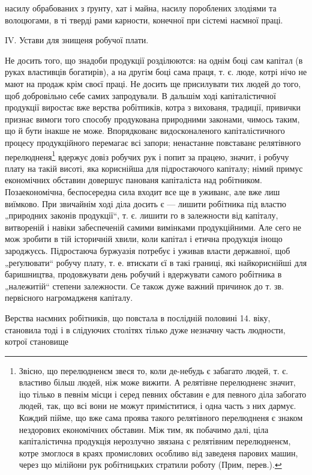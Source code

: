 насилу обрабованих з ґрунту, хат і майна, насилу пороблених
злодіями та волоцюгами, в ті тверді рами карности,
конечної при сістемі наємної праці.

IV.    Устави для знищеня робучої плати.

Не досить того, що знадоби продукції розділюются:
на однім боці сам капітал (в руках властивців богатирів),
а на другім боці сама праця, т. є. люде, котрі нічо не мают
на продаж крім своєї праці. Не досить ще присилувати
тих людей до того, щоб добровільно себе самих запродували.
В дальшім ході капіталістичної продукції виростає
вже верства робітпиків, котра з вихованя, традиції, привички
признає вимоги того способу продукована природними законами,
чимось таким, що й бути інакше не може. Впорядкованє
видосконаленого капіталістичного процесу продукційного
перемагає всі запори; ненастанне повставанє релятівного
перелюдненя\footnote*{
Звісно, що перелюдненєм звеся то, коли де-небудь є забагато
людей, т. є. властиво більш людей, ніж може вижити. А релятівне перелюдненє
значит, іцо тілько в певнім місци і серед певних обставин е для
певного діла забогато людей, так, що всі вони не можут приміститися,
і одна часть з них дармує. Кождий пійме, що вже сама проява такого
релятівного перелюдненя є знаком нездорових економічних обставин.
Між тим, як побачимо далі, ціла капіталістична продукція нерозлучно
звязана с релятівним перелюдненєм, котре змоглося в краях промислових
особливо від заведеня парових машин, через що мілійони рук робітницьких
стратили роботу (Прим, перев.).
} вдержує довіз робучих рук і попит
за працею, значит, і робучу плату на такій висоті, яка кориснійша
для підростаючого капіталу; німий примус економічних
обставин довершує панованя капіталіста над робітником.
Позаекономічна, беспосередна сила входит все ще
в уживанє, але вже лиш виїмково. При звичайнім ході діла
досить є — лишити робітника під властю „природних законів
продукції“, т. є. лишити го в залежности від капіталу,
витвореній і навіки забеспеченій самими вимінками
продукційними. Але сего не мож зробити в тій історичній
хвили, коли капітал і етична продукція інощо зароджуєсь.
Підростаюча буржуазія потребує і уживав власти державної,
щоб „реґулювати“ робучу плату, т. е. втискати єї в такі
границі, які найкориснійші для баришництва, продовжувати
день робучий і вдержувати самого робітника в „належитій“
степени залежности. Се також дуже важний причинок до
т. зв. первісного нагромадженя капіталу.

Верства наємних робітників, що повстала в послідній
половині 14. віку, становила тоді і в слідуючих столітях
тілько дуже незначну часть людности, котрої становище